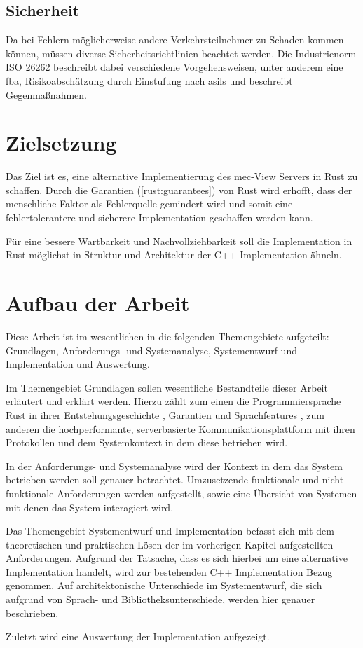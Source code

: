 \subsection{Sicherheit}
Da bei Fehlern möglicherweise andere Verkehrsteilnehmer zu Schaden kommen können, müssen diverse Sicherheitsrichtlinien beachtet werden. Die Industrienorm ISO 26262 beschreibt dabei verschiedene Vorgehensweisen,
unter anderem eine \gls{fba}, Risikoabschätzung durch Einstufung nach \glspl{asil} und beschreibt Gegenmaßnahmen.


\section{Zielsetzung}

Das Ziel ist es, eine alternative Implementierung des \gls{mec}-View Servers in Rust zu schaffen.
Durch die Garantien (\autoref{rust:guarantees}) von Rust wird erhofft, dass der menschliche Faktor als Fehlerquelle gemindert wird und somit eine fehlertolerantere und sicherere Implementation geschaffen werden kann.

Für eine bessere Wartbarkeit und Nachvollziehbarkeit soll die Implementation in Rust möglichst in Struktur und Architektur der C++ Implementation ähneln.


\section{Aufbau der Arbeit}

Diese Arbeit ist im wesentlichen in die folgenden Themengebiete aufgeteilt: Grundlagen, Anforderungs- und Systemanalyse, Systementwurf und Implementation und Auswertung.

Im Themengebiet Grundlagen sollen wesentliche Bestandteile dieser Arbeit erläutert und erklärt werden.
Hierzu zählt zum einen die Programmiersprache Rust in ihrer Entstehungsgeschichte , Garantien   und Sprachfeatures , zum anderen die hochperformante, serverbasierte Kommunikationsplattform mit ihren Protokollen  und dem Systemkontext in dem diese betrieben wird.

In der Anforderungs- und Systemanalyse wird der Kontext in dem das System betrieben werden soll genauer betrachtet. Umzusetzende funktionale und nicht-funktionale Anforderungen werden aufgestellt, sowie eine Übersicht von Systemen mit denen das System interagiert wird.

Das Themengebiet Systementwurf und Implementation befasst sich mit dem theoretischen und praktischen Lösen der im vorherigen Kapitel aufgestellten Anforderungen. Aufgrund der Tatsache, dass es sich hierbei
um eine alternative Implementation handelt, wird zur bestehenden C++ Implementation Bezug genommen.
Auf architektonische Unterschiede im Systementwurf, die sich aufgrund von Sprach- und Bibliotheksunterschiede, werden hier genauer beschrieben.

Zuletzt wird eine Auswertung der Implementation aufgezeigt. 